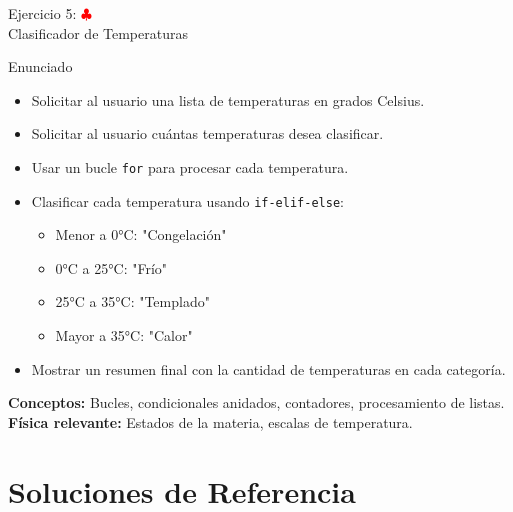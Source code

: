 \documentclass[10pt]{beamer}
\begin{document}
\begin{frame}{Ejercicio 5: \hfill \textcolor{red}{$\clubsuit$} \\ Clasificador de Temperaturas}
  \begin{block}{Enunciado}
    \begin{itemize}
      \item Solicitar al usuario una lista de temperaturas en grados Celsius.
      \item Solicitar al usuario cuántas temperaturas desea clasificar.
      \item Usar un bucle \texttt{for} para procesar cada temperatura.
      \item Clasificar cada temperatura usando \texttt{if-elif-else}:
        \begin{itemize}
          \item Menor a 0°C: "Congelación"
          \item 0°C a 25°C: "Frío"
          \item 25°C a 35°C: "Templado"
          \item Mayor a 35°C: "Calor"
        \end{itemize}
      \item Mostrar un resumen final con la cantidad de temperaturas en cada categoría.
    \end{itemize}
  \end{block}
  
  \textbf{Conceptos:} Bucles, condicionales anidados, contadores, procesamiento de listas.
  \\
  \textbf{Física relevante:} Estados de la materia, escalas de temperatura.
\end{frame}



\section{Soluciones de Referencia}
\end{document}
